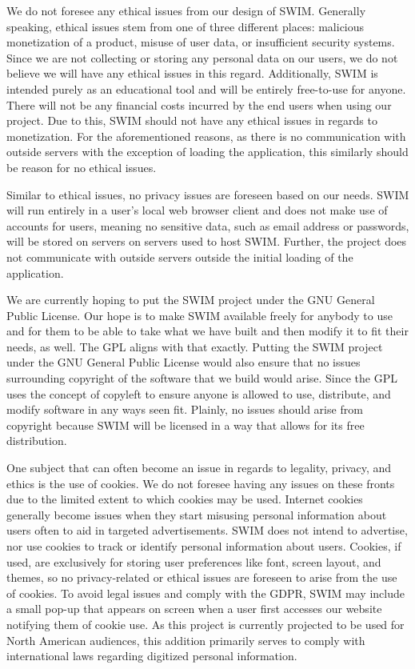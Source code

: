 \documentclass[
    paper=letter,
    parskip=half,
    fontsize=12pt,
    titlepage=firstiscover,
    toc=bibliography,
    numbers=endperiod
]{scrartcl}
\begin{document}
We do not foresee any ethical issues from our design of SWIM. Generally speaking, ethical issues stem from one of three different places: malicious monetization of a product, misuse of user data, or insufficient security systems. Since we are not collecting or storing any personal data on our users, we do not believe we will have any ethical issues in this regard. Additionally, SWIM is intended purely as an educational tool and will be entirely free-to-use for anyone. There will not be any financial costs incurred by the end users when using our project. Due to this, SWIM should not have any ethical issues in regards to monetization. For the aforementioned reasons, as there is no communication with outside servers with the exception of loading the application, this similarly should be reason for no ethical issues.

Similar to ethical issues, no privacy issues are foreseen based on our needs. SWIM will run entirely in a user's local web browser client and does not make use of accounts for users, meaning no sensitive data, such as email address or passwords, will be stored on servers on servers used to host SWIM. Further, the project does not communicate with outside servers outside the initial loading of the application.

We are currently hoping to put the SWIM project under the GNU General Public License. Our hope is to make SWIM available freely for anybody to use and for them to be able to take what we have built and then modify it to fit their needs, as well. The GPL aligns with that exactly.  Putting the SWIM project under the GNU General Public License would also ensure that no issues surrounding copyright of the software that we build would arise. Since the GPL uses the concept of copyleft to ensure anyone is allowed to use, distribute, and modify software in any ways seen fit. Plainly, no issues should arise from copyright because SWIM will be licensed in a way that allows for its free distribution.

One subject that can often become an issue in regards to legality, privacy, and ethics is the use of cookies. We do not foresee having any issues on these fronts due to the limited extent to which cookies may be used. Internet cookies generally become issues when they start misusing personal information about users often to aid in targeted advertisements. SWIM does not intend to advertise, nor use cookies to track or identify personal information about users. Cookies, if used, are exclusively for storing user preferences like font, screen layout, and themes, so no privacy-related or ethical issues are foreseen to arise from the use of cookies. To avoid legal issues and comply with the GDPR, SWIM may include a small pop-up that appears on screen when a user first accesses our website notifying them of cookie use. As this project is currently projected to be used for North American audiences, this addition primarily serves to comply with international laws regarding digitized personal information.
\end{document}

